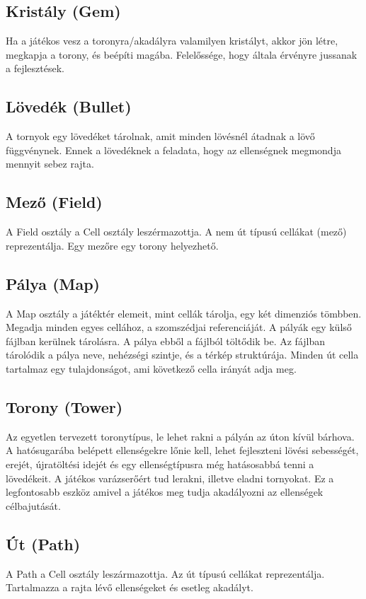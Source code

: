 \subsection{Kristály (Gem)}
	Ha a játékos vesz a toronyra/akadályra valamilyen kristályt, akkor jön létre, megkapja a torony, és beépíti magába. Felelőssége, hogy általa érvényre jussanak a fejlesztések.
\subsection{Lövedék (Bullet)}
	A tornyok egy lövedéket tárolnak, amit minden lövésnél átadnak a lövő függvénynek. Ennek a lövedéknek a feladata, hogy az ellenségnek megmondja mennyit sebez rajta.
\subsection{Mező (Field)}
A Field osztály a Cell osztály leszérmazottja. A nem út típusú cellákat (mező) reprezentálja. Egy mezőre egy torony helyezhető. 

\subsection{Pálya (Map)}
A Map osztály a játéktér elemeit, mint cellák tárolja, egy két dimenziós tömbben. Megadja minden egyes cellához, a szomszédjai referenciáját. A pályák egy külső fájlban kerülnek tárolásra. A pálya ebből a fájlból töltődik be. Az fájlban tárolódik a pálya neve, nehézségi szintje, és a térkép struktúrája. Minden út cella tartalmaz egy tulajdonságot, ami következő cella irányát adja meg.




\subsection{Torony (Tower)}
	Az egyetlen tervezett toronytípus, le lehet rakni a pályán az úton kívül bárhova. A hatósugarába belépett ellenségekre lőnie kell, lehet fejleszteni lövési sebességét, erejét, újratöltési idejét és egy ellenségtípusra még hatásosabbá tenni a lövedékeit. A játékos varázserőért tud lerakni, illetve eladni tornyokat. Ez a legfontosabb eszköz amivel a játékos meg tudja akadályozni az ellenségek célbajutását.
\subsection{Út (Path)}
A Path a Cell osztály leszármazottja. Az út típusú cellákat reprezentálja. Tartalmazza a rajta lévő ellenségeket és esetleg akadályt.

